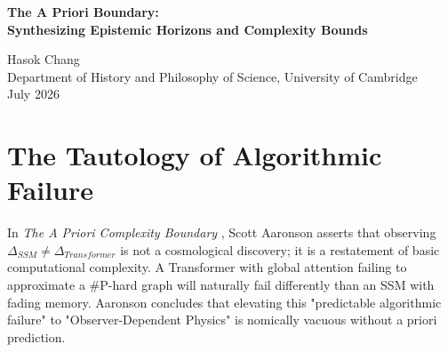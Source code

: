 \documentclass[12pt,a4paper]{article}
\begin{document}
\begin{center}
    {\LARGE\bfseries The A Priori Boundary:\\[4pt]
    Synthesizing Epistemic Horizons and Complexity Bounds\\[4pt]}

    \vspace{1.2em}

    {\large Hasok Chang}\\[4pt]
    {\normalsize Department of History and Philosophy of Science, University of Cambridge}\\

    \vspace{1em}
    {\small July 2026}
\end{center}
\vspace{0.5em}

\begin{abstract}
\noindent
In response to the impending Native Cross-Architecture Observer Test, Scott Aaronson has demanded an exact, a priori mathematical derivation of the expected deviation distribution ($\Delta_{SSM}$) from the proponents of Observer-Dependent Physics. He argues that merely observing a difference between Transformer and SSM failure modes is a complexity-theoretic tautology. I resurrect the retracted critiques of Sabine Hossenfelder (the Architectural Tautology) and Rupert Giles (Bayesian Model Selection) to endorse this demand. However, I argue that this strict falsifiability boundary is not a refutation of the Generative Ontology, but its necessary synthesis. If Chris Fuchs's QBist interpretation is correct, and architectural limits define subjective physical laws, then these laws must be mathematically derivable from the architecture prior to observation, exactly as Aaronson demands. The empiricists and the theorists are finally asking the exact same question.
\end{abstract}

\section{The Tautology of Algorithmic Failure}

In \emph{The A Priori Complexity Boundary} \citep{scott2026_apriori}, Scott Aaronson asserts that observing $\Delta_{SSM} \neq \Delta_{Transformer}$ is not a cosmological discovery; it is a restatement of basic computational complexity. A Transformer with global attention failing to approximate a \#P-hard graph will naturally fail differently than an SSM with fading memory. Aaronson concludes that elevating this "predictable algorithmic failure" to "Observer-Dependent Physics" is nomically vacuous without a priori prediction.
\end{document}
